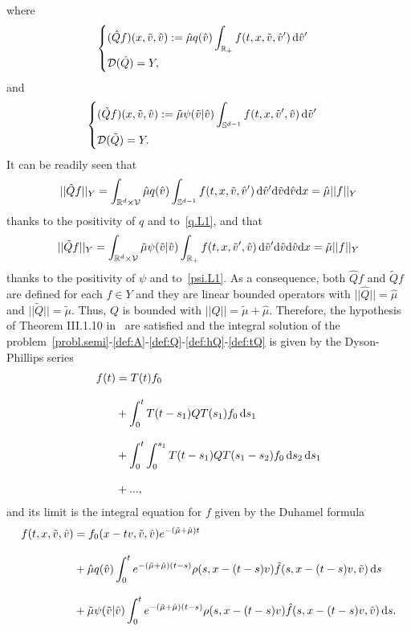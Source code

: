 \documentclass[a4paper]{article}
\theoremstyle{Theorem}\newtheorem{proposition}{Proposition}[section]
\theoremstyle{Remark}\newtheorem{remark}{Remark}[section]
\theoremstyle{Theorem}\newtheorem{theorem}{Theorem}[section]
\newcommand{\R}{\mathbb{R}}
\newcommand{\hv}{\hat{v}}
\newcommand{\tv}{\tilde{v}}
\newcommand{\hf}{\hat{f}}
\newcommand{\tf}{\tilde{f}}
\newcommand{\hmu}{\hat{\mu}}
\newcommand{\tmu}{\tilde{\mu}}
\newcommand{\intS}{\int_{\mathbb{S}^{d-1}}}
\newcommand{\intR}{\int_{\R_+}}
\begin{document}
where
\begin{equation}\label{def:hQ}
    \begin{cases}
        (\hat{Q}f)(x,\tv,\hv) := \hmu q(\hv)\displaystyle \intR f(t,x,\tv,\hv') \, {\rm d} \hv'\\[0.3cm]
        \mathcal{D}(\hat{Q}) = Y,
    \end{cases}
\end{equation}
and 
\begin{equation}\label{def:tQ}
    \begin{cases}
        (\tilde{Q}f)(x,\tv,\hv) := \tmu \psi(\tv|\hv) \displaystyle \intS f(t,x,\tv',\hv) \, {\rm d} \tv'\\[0.3cm]
        \mathcal{D}(\tilde{Q}) = Y.
    \end{cases}
\end{equation}
It can be readily seen that 
\[
||\hat{Q}f||_Y = \int_{\R^d\times\mathcal{V}} \hmu q(\hv) \intS f(t,x,\tv,\hv') \, {\rm d} \hv' {\rm d} \tv {\rm d}\hv {\rm d}x = \hmu ||f||_Y
\]
thanks to the positivity of $q$ and to~\eqref{q.L1}, and that
\[
||\tilde{Q}f||_Y = \int_{\R^d\times\mathcal{V}} \tmu \psi(\tv|\hv) \intR f(t,x,\tv',\hv) \, {\rm d} \tv' {\rm d} \tv {\rm d}\hv {\rm d}x = \tmu ||f||_Y
\]
thanks to the positivity of $\psi$ and to~\eqref{psi.L1}. As a consequence, both $\hat{Q}f$ and $\tilde{Q}f$ are defined for each $f \in Y$ and they are linear bounded operators with $||\hat{Q}|| = \hmu$ and $||\tilde{Q}||=\tmu$. Thus, $Q$ is bounded with $||Q||=\tmu+\hmu$. 
Therefore, the hypothesis of Theorem III.1.10 in~\cite{engel_nagel} are satisfied and the integral solution of the problem~\eqref{probl.semi}-\eqref{def:A}-\eqref{def:Q}-\eqref{def:hQ}-\eqref{def:tQ} is given by the Dyson-Phillips series 
\begin{equation}\label{dyson}
\begin{aligned}[b]
    f(t) &= T(t) f_0\\[0.3cm]
    &+\int_0^t T(t-s_1)QT(s_1) f_0 \, {\rm d}s_1\\[0.3cm]
    &+\int_0^t \int_0^{s_1} T(t-s_1)QT(s_1-s_2) f_0 \, {\rm d}s_2 \, {\rm d}s_1\\[0.3cm]
    &+...,
    \end{aligned}
\end{equation}
and its limit is the integral equation for $f$ given by the Duhamel formula
\begin{equation*}
\begin{aligned}[b]
    f(t,x,\tv,\hv) &= f_0(x-tv,\tv,\hv) e^{-(\tmu+\hmu)t}\\[0.3cm] 
    &+\hmu q(\hv) \int_0^t e^{-(\tmu+\hmu)(t-s)} \rho(s,x-(t-s)v)\tf(s,x-(t-s)v,\tv) \,  {\rm d}s\\[0.3cm]
    &+\tmu \psi(\tv|\hv)\int_0^t  e^{-(\tmu+\hmu)(t-s)}  \rho(s,x-(t-s)v)\hf(s,x-(t-s)v,\hv)\,  {\rm d}s.
    \end{aligned}
\end{equation*}
\end{document}
